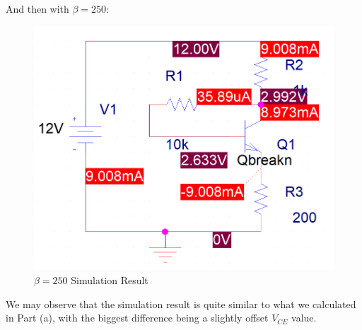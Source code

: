 \begin{enumerate}
\begin{enumerate}
        And then with $\beta=250$:

        \begin{figure}[H]
          \centering
          \includegraphics[width=.9\textwidth]{Figures/HW6-3c}
          \caption{$\beta=250$ Simulation Result}
          \label{fig:10}
        \end{figure}

        We may observe that the simulation result is quite similar to what we calculated in Part (a), with the biggest difference being a slightly offset $V_{CE}$ value.

    \end{enumerate}

\end{enumerate}



